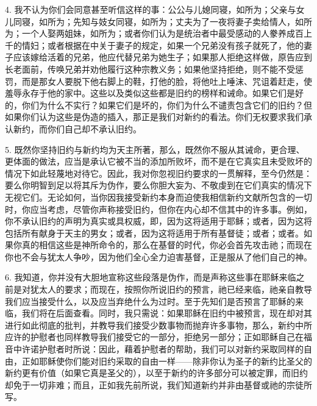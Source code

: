 4. 我不认为你们会同意甚至听信这样的事：公公与儿媳同寝，如所为；父亲与女儿同寝，如所为；先知与妓女同寝，如所为；丈夫为了一夜将妻子卖给情人，如所为；一个人娶两姐妹，如所为；或者你们认为是统治者中最受感动的人豢养成百上千的情妇；或者根据在中关于妻子的规定，如果一个兄弟没有孩子就死了，他的妻子应该嫁给活着的兄弟，他应代替兄弟为她生子；如果那人拒绝这样做，原告应到长老面前，传唤兄弟并劝他履行这种宗教义务；如果他坚持拒绝，则不能不受惩罚，而是那女人要脱下他右脚上的鞋，打他的脸，将他吐上唾沫、咒诅着赶走，使羞辱永存于他的家中。这些以及类似这些都是旧约的榜样和诫命。如果它们是好的，你们为什么不实行？如果它们是坏的，你们为什么不谴责包含它们的旧约？但如果你们认为这些是伪造的插入，那正是我们对新约的看法。你们无权要求我们承认新约，而你们自己却不承认旧约。\par

5. 既然你坚持旧约与新约均为天主所著，那么，既然你不服从其诫命，更合理、更体面的做法，应当是承认它被不当的添加所败坏，而不是在它真实且未受败坏的情况下如此轻蔑地对待它。因此，我对你忽视旧约要求的一贯解释，至今仍然是：要么你明智到足以将其斥为伪作，要么你胆大妄为、不敬虔到在它们真实的情况下无视它们。无论如何，当你因我接受新约本身而迫使我相信新约文献所包含的一切时，你应当考虑，尽管你声称接受旧约，但你在内心却不信其中的许多事。例如，你不承认旧约的声明为真实或具权威，即，因为这将适用于耶稣；或者，因为这将包括所有献身于天主的男女；或者，因为这将适用于所有基督徒；或者；或者。如果你真的相信这些是神所命令的，那么在基督的时代，你必会首先攻击祂；而现在你也不会与犹太人争吵，因为他们全心全力迫害基督，正是服从了他们自己的神。\par

6. 我知道，你并没有大胆地宣称这些段落是伪作，而是声称这些事在耶稣来临之前是对犹太人的要求；而现在，按照你所说旧约的预言，祂已经来临，祂亲自教导我们应当接受什么，以及应当弃绝什么为过时。至于先知们是否预言了耶稣的来临，我们将在后面查看。同时，我只需说：如果耶稣在旧约中被预言，现在却对其进行如此彻底的批判，并教导我们接受少数事物而抛弃许多事物，那么，新约中所应许的护慰者也同样教导我们接受它的一部分，拒绝另一部分；正如耶稣自己在福音中许诺护慰者时所说：因此，藉着护慰者的帮助，我们可以对新约采取同样的自由，正如耶稣使你们能对旧约采取的自由一样——除非你认为圣子的新约比圣父的新约更有价值（如果它真是圣父的），以至于新约的许多部分可以被定罪，而旧约却免于一切非难；而且，正如我先前所说，我们知道新约并非由基督或祂的宗徒所写。\par

